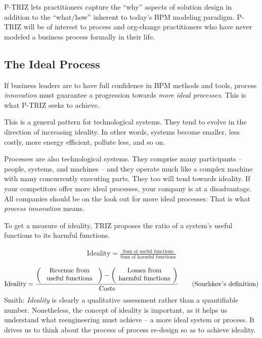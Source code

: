 \documentclass[11pt,a4paper]{article}
\begin{document}
P-TRIZ lets practitioners capture the “why” aspects of solution design in
addition to the “what/how” inherent to today’s BPM modeling paradigm. P-TRIZ
will be of interest to process and org-change practitioners who have never
modeled a business process formally in their life.

\subsection{The Ideal Process}

If business leaders are to have full confidence in BPM methods and tools,
process \emph{innovation} must guarantee a progression towards \emph{more
  ideal processes}. This is what P-TRIZ seeks to achieve.

This is a general pattern for technological systems. They tend to evolve in
the direction of increasing ideality. In other words, systems become smaller,
less costly, more energy efficient, pollute less, and so on.

Processes are also technological systems. They comprise many participants –
people, systems, and machines – and they operate much like a complex machine
with many concurrently executing parts. They too will tend towards ideality.
If your competitors offer more ideal processes, your company is at a
disadvantage. All companies should be on the look out for more ideal
processes: That is what \emph{process innovation} means.

To get a measure of ideality, TRIZ proposes the ratio of a system’s useful
functions to its harmful functions.

\begin{gather*}
  \text{Ideality}=\frac{\text{Sum of useful functions}}{\text{Sum of harmful
      functions}} \tag{Smith' definition}
\end{gather*}

\begin{gather*}
  \text{Ideality}=\frac{\left(\parbox{3cm}{\centering Revenue from useful
      functions\vskip4pt}\right) - \left(\parbox{3cm}{\centering Losses from
      harmful functions\vskip4pt}\right)}{\text{Costs}} \tag{Souchkov's
    definition}
\end{gather*}
Smith: \emph{Ideality} is clearly a qualitative assessment rather than a
quantifiable number. Nonetheless, the concept of ideality is important, as it
helps us understand what reengineering must achieve – a more ideal system or
process.  It drives us to think about the process of process re-design so as
to achieve ideality.
\end{document}
